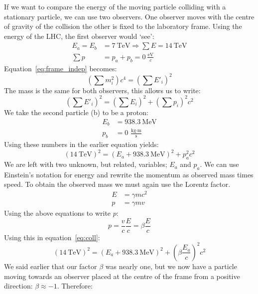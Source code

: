 \documentclass[12pt,a4paper]{article}
\numberwithin{equation}{section}
\numberwithin{figure}{section}
\numberwithin{table}{section}
\begin{document}
If we want to compare the energy of the moving particle colliding with a stationary particle, we can use two observers. One observer moves with the centre of gravity of the collision the other is fixed to the laboratory frame. Using the energy of the LHC, the first observer would `see':
\begin{align}
E_a = E_b &= 7~\mbox{TeV} \Rightarrow \sum E = 14~\mbox{TeV} \\
\sum p &= p_a + p_b = 0~\frac{\mbox{eV}}{c}
\end{align}
Equation~\ref{eq:frame_indep} becomes:
\begin{equation}
\left(  \sum m_i^2 \right)  c^4 = \left(  \sum E'_i \right)^2
\end{equation}
The mass is the same for both observers, this allows us to write:
\begin{equation}
\left(  \sum E'_i \right)^2 = \left(  \sum E_i \right)^2 + \left(  \sum p_i \right)^2 c^2
\end{equation}
We take the second particle (b) to be a proton:
\begin{align}
E_b &= 938.3~\mbox{MeV} \\
p_b &= 0~\frac{\mbox{kg} \cdot \mbox{m}}{\mbox{s}}
\end{align}
Using these numbers in the earlier equation yields:
\begin{equation}
\left(  14~\mbox{TeV} \right)^2 = \left(  E_a + 938.3~\mbox{MeV} \right)^2 + p_a^2 c^2 \label{eq:coll}
\end{equation}
We are left with two unknown, but related, variables; $E_a$ and $p_a$. We can use Einstein's notation for energy and rewrite the momentum as observed mass times speed. To obtain the observed mass we must again use the Lorentz factor.
\begin{align}
E &= \gamma m c^2 \\
p &= \gamma m v
\end{align}
Using the above equations to write $p$:
\begin{equation}
p = \frac{v}{c}\frac{E}{c} = \beta \frac{E}{c}
\end{equation}
Using this in equation~\ref{eq:coll}:
\begin{equation}
\left(  14~\mbox{TeV} \right)^2 = \left(  E_a + 938.3~\mbox{MeV} \right)^2 + \left(  \beta \frac{E_a}{c} \right)^2 c^2 \label{eq:coll2}
\end{equation}
We said earlier that our factor $\beta$ was nearly one, but we now have a particle moving towards an observer placed at the centre of the frame from a positive direction: $\beta \approx -1$. Therefore:
\end{document}
